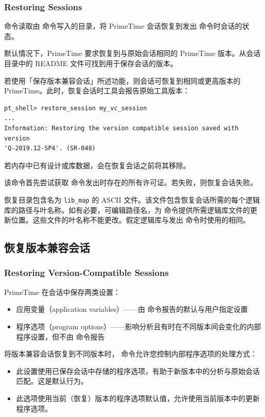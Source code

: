 \subsubsection*{Restoring Sessions}

 命令读取由  命令写入的目录，将 PrimeTime 会话恢复到发出  命令时会话的状态。

默认情况下，PrimeTime 要求恢复到与原始会话相同的 PrimeTime 版本。从会话目录中的 README 文件可找到用于保存会话的版本。

若使用「保存版本兼容会话」所述功能，则会话可恢复到相同或更高版本的 PrimeTime。此时，恢复会话时工具会报告原始工具版本：
\begin{lstlisting}
pt_shell> restore_session my_vc_session
...
Information: Restoring the version compatible session saved with version
'Q-2019.12-SP4'. (SR-048)
\end{lstlisting}

若内存中已有设计或库数据，会在恢复会话之前将其移除。

该命令首先尝试获取  命令发出时存在的所有许可证。若失败，则恢复会话失败。

恢复目录包含名为 \texttt{lib\_map} 的 ASCII 文件。该文件包含恢复会话所需的每个逻辑库的路径与叶名称。如有必要，可编辑路径名，为  命令提供所需逻辑库文件的更新位置。这些文件的叶名称不能更改。假定逻辑库与发出  命令时使用的相同。

\subsection{恢复版本兼容会话}
\subsubsection*{Restoring Version-Compatible Sessions}

PrimeTime 在会话中保存两类设置：
\begin{itemize}
  \item 应用变量（application variables）——由  命令报告的默认与用户指定设置
  \item 程序选项（program options）——影响分析且有时在不同版本间会变化的内部程序设置，但不由  命令报告
\end{itemize}

将版本兼容会话恢复到不同版本时， 命令允许您控制内部程序选项的处理方式：
\begin{itemize}
  \item {}

        此设置使用已保存会话中存储的程序选项，有助于新版本中的分析与原始会话匹配。这是默认行为。
  \item {}

        此选项使用当前（恢复）版本的程序选项默认值，允许使用当前版本中的更新程序选项。
\end{itemize}

